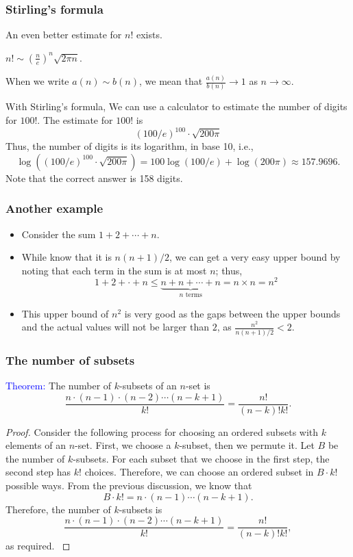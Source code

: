 \begin{frame}\frametitle{Stirling's formula}
  An even better estimate for $n!$ exists.

  \begin{theorem}
    $n!\sim \left(\frac{n}{e}\right)^n\sqrt{2\pi n}$.
  \end{theorem}

  \vspace{0.2in}
  When we write $a(n)\sim b(n)$, we mean that
  $\frac{a(n)}{b(n)}\rightarrow 1$ as $n\rightarrow\infty$.
  \pause

  With Stirling's formula, We can use a calculator to estimate the
  number of digits for $100!$.  \pause The estimate for $100!$ is
  \[ (100/e)^{100}\cdot\sqrt{200\pi}\]
  Thus, the number of digits is its logarithm, in base 10, i.e.,
  \[\log\left((100/e)^{100}\cdot\sqrt{200\pi}\right) = 100\log(100/e) + \log(200\pi) \approx 157.9696.\]
  \pause
  Note that the correct answer is 158 digits.
\end{frame}

\begin{frame}\frametitle{Another example}
  \begin{itemize}
  \item Consider the sum $1+2+\cdots+n$. \pause
  \item While know that it is $n(n+1)/2$, we can get a very easy upper
    bound by noting that each term in the sum is at most $n$; thus,
    \[ 1+2+\cdot+n\leq \underbrace{n+n+\cdots+n}_{\mbox{$n$ terms}} = n\times n = n^2 \] \pause
  \item This upper bound of $n^2$ is very good as the gaps between the
    upper bounds and the actual values will not be larger than $2$, as
    $\frac{n^2}{n(n+1)/2} < 2$.
  \end{itemize}
\end{frame}

\begin{frame}\frametitle{The number of subsets}
  \begin{tcolorbox}
    \textcolor{blue}{Theorem:}
    The number of $k$-subsets of an $n$-set is
    \[\frac{n\cdot(n-1)\cdot(n-2)\cdots(n-k+1)}{k!}=\frac{n!}{(n-k)!k!}.\]
  \end{tcolorbox}
  
  \begin{proof} {\small
    \pause Consider the following process for choosing an ordered
    subsets with $k$ elements of an $n$-set.  \pause First, we choose
    a $k$-subset, then we permute it.  Let $B$ be the number of
    $k$-subsets.  For each subset that we choose in the first step,
    the second step has $k!$ choices.  \pause Therefore, we can choose
    an ordered subset in $B\cdot k!$ possible ways.  \pause From the
    previous discussion, we know that
    \[
    B\cdot k! = n\cdot(n-1)\cdots(n-k+1).
    \]
    Therefore, the number of $k$-subsets is
    \[\frac{n\cdot(n-1)\cdot(n-2)\cdots(n-k+1)}{k!}=\frac{n!}{(n-k)!k!},\]
    as required.
    }
  \end{proof}
\end{frame}

